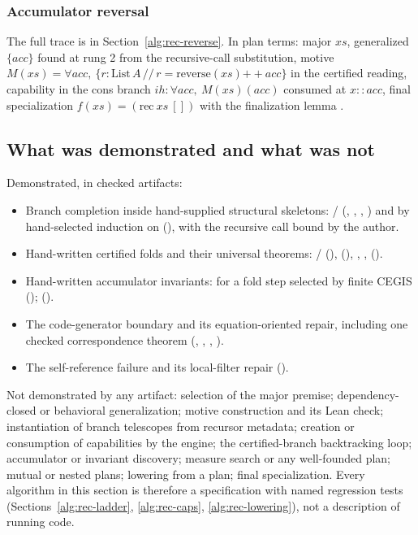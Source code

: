 \subsubsection{Accumulator reversal}

The full trace is in Section~\ref{alg:rec-reverse}. In plan terms: major $xs$, generalized $\{acc\}$ found at rung 2 from the recursive-call substitution, motive $M(xs) = \forall acc,\ \{r : \mathrm{List}\,A \,//\, r = \mathrm{reverse}(xs) \mathbin{+\!\!+} acc\}$ in the certified reading, capability in the cons branch $ih : \forall acc,\ M(xs)(acc)$ consumed at $x{::}acc$, final specialization $f(xs) = (\mathrm{rec}\ xs\ [])$ with the finalization lemma .

\subsection{What was demonstrated and what was not}\label{alg:rec-status}

Demonstrated, in checked artifacts:
\begin{itemize}
\item Branch completion inside hand-supplied structural skeletons: / (, , , ) and  by hand-selected induction on  (), with the recursive call bound by the author.
\item Hand-written certified folds and their universal theorems: / (),  (), , ,  ().
\item Hand-written accumulator invariants:  for a fold step selected by finite CEGIS ();  ().
\item The code-generator boundary and its equation-oriented repair, including one checked correspondence theorem (, , , ).
\item The self-reference failure and its local-filter repair ().
\end{itemize}
Not demonstrated by any artifact: selection of the major premise; dependency-closed or behavioral generalization; motive construction and its Lean check; instantiation of branch telescopes from recursor metadata; creation or consumption of capabilities by the engine; the certified-branch backtracking loop; accumulator or invariant discovery; measure search or any well-founded plan; mutual or nested plans; lowering from a plan; final specialization. Every algorithm in this section is therefore a specification with named regression tests (Sections~\ref{alg:rec-ladder}, \ref{alg:rec-caps}, \ref{alg:rec-lowering}), not a description of running code.
